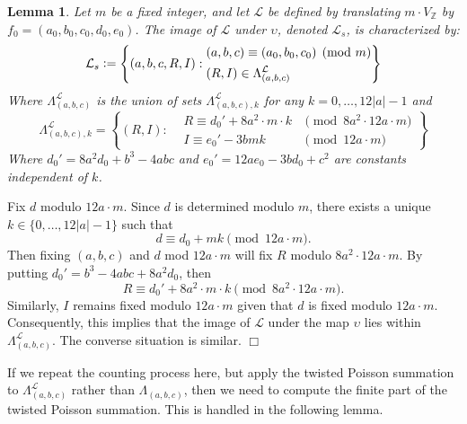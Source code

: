 \documentclass{article}
\newtheorem{lemma}[theorem]{Lemma}
\newenvironment{proof}{\noindent {\bf Proof:}}{$\Box$ \vspace{2 ex}}
\begin{document}
\begin{lemma}
Let $m$ be a fixed integer, and let $\mathcal{L}$ be defined by translating $m \cdot V_{\mathbb{Z}}$ by $f_0 = (a_0, b_0, c_0, d_0, e_0)$. The image of $\mathcal{L}$ under $\upsilon$, denoted $\mathcal{L}_s$, is characterized by:
\begin{equation*}
\mathcal{L}_s \vcentcolon= \left\{(a,b,c,R,I):
\begin{aligned}
&(a,b,c) \equiv (a_0,b_0,c_0) \pmod m \\
&(R,I) \in \Lambda_{(a,b,c)}^{\mathcal{L}}
\end{aligned} \right\}
\end{equation*}
Where $\Lambda_{(a,b,c)}^{\mathcal{L}}$ is the union of sets $\Lambda_{(a,b,c),k}^{\mathcal{L}}$ for any $k = 0, \ldots, 12|a| - 1$ and
\begin{equation*}
\Lambda_{(a,b,c),k}^{\mathcal{L}} = \left\{ (R,I):
\begin{aligned}
& R\equiv d_0'+8a^2\cdot m \cdot k &\pmod{8a^2\cdot 12a \cdot m}\\
&I \equiv e_0'-3bmk &\pmod {12a\cdot m}
\end{aligned}\right\}
\end{equation*}
Where $d_0'=8a^2d_0+b^3-4abc$ and $e_0'=12ae_0-3bd_0+c^2$ are constants independent of $k$.
\end{lemma}
\begin{proof}
Fix $d$ modulo $12a \cdot m$. Since $d$ is determined modulo $m$, there exists a unique $k \in \{0, \ldots, 12|a| - 1\}$ such that
\begin{equation*}
d \equiv d_0+ mk \pmod{12a \cdot m}.
\end{equation*}
Then fixing $(a,b,c)$ and $d$ mod $12a\cdot m$ will fix $R$ modulo $8a^2\cdot 12 a \cdot m$. By putting $d_0'=b^3-4abc+8a^2d_0$, then  
\begin{equation*}
R \equiv d_0'+8a^2\cdot m\cdot k   \pmod{8a^2\cdot 12a \cdot m}.
\end{equation*}
Similarly, $I$ remains fixed modulo $12a \cdot m$ given that $d$ is fixed modulo $12a\cdot m$. Consequently, this implies that the image of $\mathcal{L}$ under the map $\upsilon$ lies within $\Lambda_{(a,b,c)}^{\mathcal{L}}$.
The converse situation is similar. 
\end{proof}

If we repeat the counting process here, but apply the twisted Poisson summation to $\Lambda_{(a,b,c)}^{\mathcal{L}}$ rather than $\Lambda_{(a,b,c)}$, then we need to compute the finite part of the twisted Poisson summation. This is handled in the following lemma.
\end{document}
